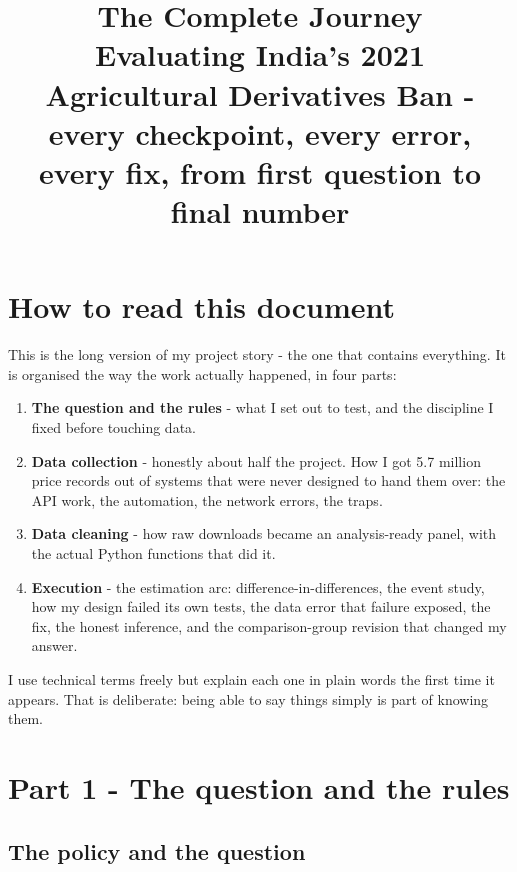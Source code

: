 \documentclass[11pt]{article}
\title{\textbf{The Complete Journey}\\[4pt]
\large Evaluating India's 2021 Agricultural Derivatives Ban -\\
every checkpoint, every error, every fix, from first question to final number}
\author{}\date{}
\begin{document}
\maketitle
\tableofcontents
\newpage

\section{How to read this document}

This is the long version of my project story - the one that contains everything. It is
organised the way the work actually happened, in four parts:

\begin{enumerate}[leftmargin=1.8em,itemsep=1pt]
  \item \textbf{The question and the rules} - what I set out to test, and the discipline I
        fixed before touching data.
  \item \textbf{Data collection} - honestly about half the project. How I got 5.7 million
        price records out of systems that were never designed to hand them over: the API
        work, the automation, the network errors, the traps.
  \item \textbf{Data cleaning} - how raw downloads became an analysis-ready panel, with
        the actual Python functions that did it.
  \item \textbf{Execution} - the estimation arc: difference-in-differences, the event
        study, how my design failed its own tests, the data error that failure exposed,
        the fix, the honest inference, and the comparison-group revision that changed my
        answer.
\end{enumerate}

I use technical terms freely but explain each one in plain words the first time it
appears. That is deliberate: being able to say things simply is part of knowing them.

\section{Part 1 - The question and the rules}

\subsection{The policy and the question}
\end{document}
